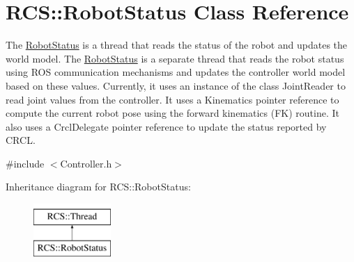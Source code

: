 \hypertarget{classRCS_1_1RobotStatus}{\section{R\-C\-S\-:\-:Robot\-Status Class Reference}
\label{classRCS_1_1RobotStatus}
}


The \hyperlink{classRCS_1_1RobotStatus}{Robot\-Status} is a thread that reads the status of the robot and updates the world model. The \hyperlink{classRCS_1_1RobotStatus}{Robot\-Status} is a separate thread that reads the robot status using R\-O\-S communication mechanisms and updates the controller world model based on these values. Currently, it uses an instance of the class Joint\-Reader to read joint values from the controller. It uses a Kinematics pointer reference to compute the current robot pose using the forward kinematics (F\-K) routine. It also uses a Crcl\-Delegate pointer reference to update the status reported by C\-R\-C\-L.  




{\ttfamily \#include $<$Controller.\-h$>$}

Inheritance diagram for R\-C\-S\-:\-:Robot\-Status\-:\begin{figure}[H]
\begin{center}
\leavevmode
\includegraphics[height=2.000000cm]{classRCS_1_1RobotStatus}
\end{center}
\end{figure}
